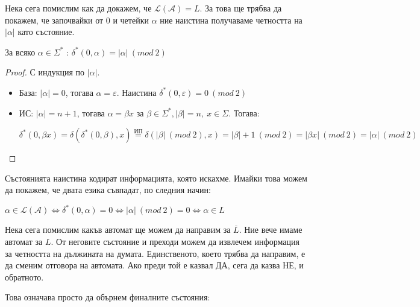 Нека сега помислим как да докажем, че $\mathcal{L(A)} = L$.
За това ще трябва да покажем, че започвайки от $0$ и четейки $\alpha$ ние наистина получаваме четността на $|\alpha|$ като състояние.

\begin{claim}
    За всяко $\alpha \in \Sigma^*$ : $\delta^*(0, \alpha) = |\alpha| \: (mod \: 2)$
\end{claim}

\begin{proof}
    С индукция по $|\alpha|$.
    \begin{itemize}
        \item База: $|\alpha| = 0$, тогава $\alpha = \varepsilon$.
              Наистина $\delta^*(0, \varepsilon) = 0 \: (mod \: 2)$ \checkmark
        \item ИС: $|\alpha| = n + 1$, тогава $\alpha = \beta x$ за $\beta \in \Sigma^*, |\beta| = n, \: x \in \Sigma$.
              Тогава:
              \begin{center}
                  $\delta^*(0, \beta x) = \delta(\delta^*(0, \beta), x) \stackrel{\text{ИП}}{=} \delta(|\beta| \: (mod \: 2), x) = |\beta| + 1 \: (mod \: 2) = |\beta x| \: (mod \: 2) = |\alpha| \: (mod \: 2)$
              \end{center}
    \end{itemize}
\end{proof}

Състоянията наистина кодират информацията, която искахме.
Имайки това можем да покажем, че двата езика съвпадат, по следния начин:
\begin{center}
    $\alpha \in \mathcal{L(A)} \iff \delta^*(0, \alpha) = 0 \iff |\alpha| \: (mod \: 2) = 0 \iff \alpha \in L$
\end{center}


Нека сега помислим какъв автомат ще можем да направим за $\overline{L}$.
Ние вече имаме автомат за $L$.
От неговите състояние и преходи можем да извлечем информация за четността на дължината на думата.
Единственото, което трябва да направим, е да сменим отговора на автомата.
Ако преди той е казвал ДА, сега да казва НЕ, и обратното.

\pagebreak

Това означава просто да обърнем финалните състояния:
\begin{center}
\end{center}

